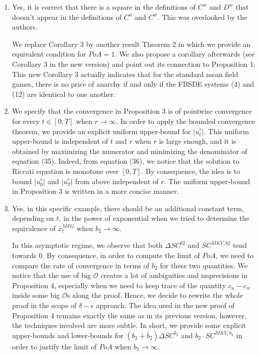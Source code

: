 \documentclass[]{article}
\begin{document}
\begin{enumerate}
	\item Yes, it is correct that there is a square in the definitions of $C^w$ and $D^w$ that doesn't appear in the definitions of $C^u$ and $C^w$. This was overlooked by the authors. %
	
	We replace Corollary 3 by another result Theorem 2 in which we provide an equivalent condition for $PoA = 1$. We also propose a corollary afterwards (see Corollary 3 in the new version) and point out its connection to Proposition 1. This new Corollary 3 actually indicates that for the standard mean field games, there is no price of anarchy if and only if the FBSDE systems (4) and (12) are identical to one another.
		
	
	\item We specify that the convergence in Proposition 3 is of pointwise convergence for every $t \in [0,T]$ when $r \to \infty$. In order to apply the bounded convergence theorem, we provide an explicit uniform upper-bound for $\vert u_t^{r} \vert $. This uniform upper-bound is independent of $t$ and $r$ when $r$ is large enough, and it is obtained by maximizing the numerator and minimizing the denominator of equation (35). Indeed, from equation (36), we notice that the solution to Riccati equation is monotone over $[0,T]$. By consequence, the idea is to bound $\vert u_0^r \vert$ and $\vert u_T^r \vert$ from above independent of $r$. The uniform upper-bound in Proposition 3 is written in a more concise manner.
	
	\item Yes, in this specific example, there should be an additional constant term, depending on $t$, in the power of exponential when we tried to determine the equivalence of $\bar{x}_t^{MFG}$ when $b_2 \to \infty$.
	
	In this asymptotic regime, we observe that both $\Delta SC^{b2}$ and $SC^{MKV,b2}$ tend towards $0$. By consequence, in order to compute the limit of $PoA$, we need to compare the rate of convergence in terms of $b_2$ for these two quantities. We notice that the use of big $\mathcal{O}$ creates a lot of ambiguities and imprecisions in Proposition 4, especially when we need to keep trace of the quantity $c_u -c_w$ inside some big $\mathcal{O}$s along the proof. Hence, we decide to rewrite the whole proof in the scope of $\delta-\epsilon$ approach. The idea used in the new proof of Proposition 4 remains exactly the same as in its previous version, however, the techniques involved are more subtle. In short, we provide some explicit upper-bounds and lower-bounds for $(b_2 + \bar{b}_2) \Delta SC^{b_2}$ and $b_2 \cdot SC^{MKV,b_2}$ in order to justify the limit of $PoA$ when $b_2 \to \infty$.
	

\end{enumerate}
\end{document}
